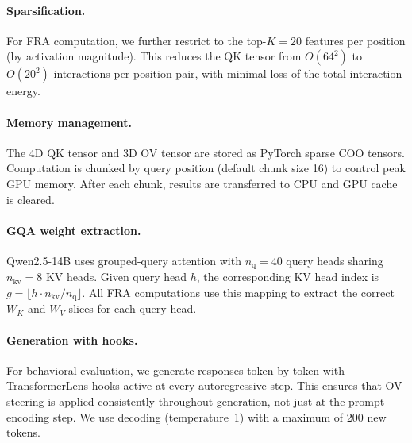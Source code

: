 \documentclass{article} %
\theoremstyle{plain}
\theoremstyle{definition}
\theoremstyle{remark}
\newcommand{\WK}{W_K}
\newcommand{\WV}{W_V}
\newcommand{\dmodel}{d_{\mathrm{model}}}
\newcommand{\dhead}{d_{\mathrm{head}}}
\begin{document}
\paragraph{Sparsification.} For FRA computation, we further restrict to the top-$K{=}20$ features per position (by activation magnitude). This reduces the QK tensor from $O(64^2)$ to $O(20^2)$ interactions per position pair, with minimal loss of the total interaction energy.

\paragraph{Memory management.} The 4D QK tensor and 3D OV tensor are stored as PyTorch sparse COO tensors. Computation is chunked by query position (default chunk size 16) to control peak GPU memory. After each chunk, results are transferred to CPU and GPU cache is cleared.


\paragraph{GQA weight extraction.} Qwen2.5-14B uses grouped-query attention with $n_{\mathrm{q}} = 40$ query heads sharing $n_{\mathrm{kv}} = 8$ KV heads. Given query head $h$, the corresponding KV head index is $g = \lfloor h \cdot n_{\mathrm{kv}} / n_{\mathrm{q}} \rfloor$. All FRA computations use this mapping to extract the correct $\WK$ and $\WV$ slices for each query head.


\paragraph{Generation with hooks.} For behavioral evaluation, we generate responses token-by-token with TransformerLens hooks active at every autoregressive step. This ensures that OV steering is applied consistently throughout generation, not just at the prompt encoding step. We use decoding (temperature~1) with a maximum of 200 new tokens.
\end{document}
